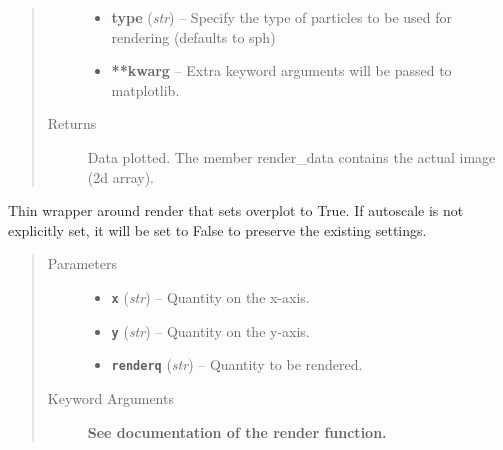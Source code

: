 \documentclass[letterpaper,10pt,english]{sphinxmanual}
\begin{document}
\begin{fulllineitems}
\begin{quote}
\begin{description}
\begin{itemize}
\item {} 
\textbf{type} (\emph{str}) --
Specify the type of particles to be used for rendering (defaults to sph)

\item {} 
\textbf{**kwarg} --
Extra keyword arguments will be passed to matplotlib.

\end{itemize}

\item[{Returns}] \leavevmode
Data plotted. The member render\_data contains the actual image (2d array).

\end{description}\end{quote}

\end{fulllineitems}


\begin{fulllineitems}
\label{index:facade.addrender}
Thin wrapper around render that sets overplot to True.  If autoscale is
not explicitly set, it will be set to False to preserve the existing settings.
\begin{quote}\begin{description}
\item[{Parameters}] \leavevmode\begin{itemize}
\item {} 
\textbf{\texttt{x}} (\emph{str}) -- Quantity on the x-axis.

\item {} 
\textbf{\texttt{y}} (\emph{str}) -- Quantity on the y-axis.

\item {} 
\textbf{\texttt{renderq}} (\emph{str}) -- Quantity to be rendered.

\end{itemize}

\item[{Keyword Arguments}] \leavevmode
\textbf{See documentation of the render function.}

\end{description}\end{quote}

\end{fulllineitems}

\end{document}

